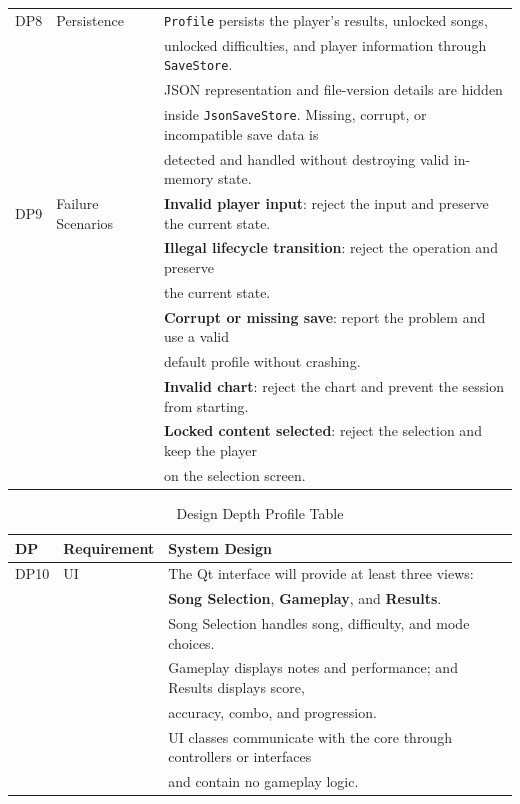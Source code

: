 \documentclass[12pt,a4paper]{article}
\begin{document}
\begin{table}[H]
\begin{tabular}{@{}lll@{}}
        \addlinespace

        DP8 &
        Persistence &
        \texttt{Profile} persists the player's results, unlocked songs, \\ & &
        unlocked difficulties, and player information through
        \texttt{SaveStore}. \\ & & JSON representation and file-version details
        are hidden \\ & &inside \texttt{JsonSaveStore}. Missing, corrupt, or
        incompatible save data is \\ & &detected and handled without
        destroying valid in-memory state. \\

        \addlinespace

        DP9 &
        Failure Scenarios &
        \textbf{Invalid player input}: reject the input and
        preserve the current state. \\ & & \textbf{Illegal lifecycle
        transition}: reject the operation and preserve \\ & &the current
        state. \\ & &\textbf{Corrupt or missing save}: report the
        problem and use a valid \\ & &default profile without crashing.
        \\ & &\textbf{Invalid chart}: reject the chart and prevent the
        session from starting. \\ & & \textbf{Locked content
        selected}: reject the selection and keep the player\\ & & on the
        selection screen. \\

        \bottomrule
        \end{tabular}
    \end{table}

    \begin{table}[H]
        \centering
        \small
        \begin{tabular}{@{}lll@{}}
        \toprule
        DP & Requirement & System Design \\
        \midrule

        DP10 &
        UI &
        The Qt interface will provide at least three views:\\ & &
        \textbf{Song Selection}, \textbf{Gameplay}, and
        \textbf{Results}. \\ & &Song Selection handles song, difficulty, and
        mode choices.\\ & & Gameplay displays notes and performance; and
        Results displays score, \\ & &accuracy, combo, and progression.\\ & &
        UI classes communicate with the core through controllers or
        interfaces \\ & &and contain no gameplay logic. \\

        \bottomrule
        \end{tabular}
        \caption{Design Depth Profile Table}
    \end{table}
\end{document}
